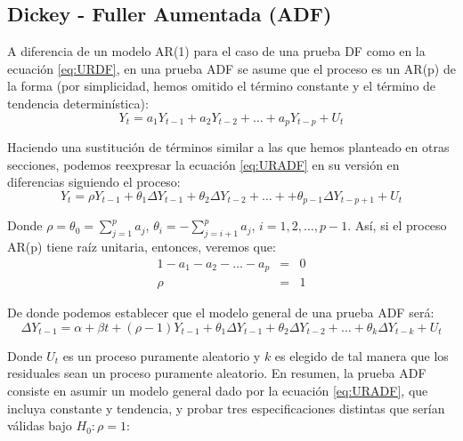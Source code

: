 \documentclass[
]{book}
\begin{document}
\hypertarget{dickey---fuller-aumentada-adf}{%
\subsection{Dickey - Fuller Aumentada (ADF)}\label{dickey---fuller-aumentada-adf}}

A diferencia de un modelo AR(1) para el caso de una prueba DF como en la ecuación \eqref{eq:URDF}, en una prueba ADF se asume que el proceso es un AR(p) de la forma (por simplicidad, hemos omitido el término constante y el término de tendencia determinística):
\begin{equation}
    Y_t = a_1 Y_{t-1} + a_2 Y_{t-2} + \ldots + a_p Y_{t-p} + U_t
    \label{eq:URADF}
\end{equation}

Haciendo una sustitución de términos similar a las que hemos planteado en otras secciones, podemos reexpresar la ecuación \eqref{eq:URADF} en su versión en diferencias siguiendo el proceso:
\begin{equation}
    Y_t = \rho Y_{t-1} + \theta_1 \Delta Y_{t-1} + \theta_2 \Delta Y_{t-2} + \ldots + + \theta_{p-1} \Delta Y_{t-p+1} + U_t 
\end{equation}

Donde \(\rho = \theta_0 = \sum_{j = 1}^p a_j\), \(\theta_i = - \sum_{j = i + 1}^p a_j\), \(i = 1, 2, \ldots, p-1\). Así, si el proceso AR(p) tiene raíz unitaria, entonces, veremos que:
\begin{eqnarray*}
    1 - a_1 - a_2 - \ldots - a_p & = & 0 \\
    \rho & = & 1
\end{eqnarray*}

De donde podemos establecer que el modelo general de una prueba ADF será:
\begin{equation}
    \Delta Y_{t-1} = \alpha + \beta t + (\rho - 1) Y_{t-1} + \theta_1 \Delta Y_{t-1} + \theta_2 \Delta Y_{t-2} + \ldots + \theta_k \Delta Y_{t-k} + U_t
\end{equation}

Donde \(U_t\) es un proceso puramente aleatorio y \(k\) es elegido de tal manera que los residuales sean un proceso puramente aleatorio. En resumen, la prueba ADF consiste en asumir un modelo general dado por la ecuación \eqref{eq:URADF}, que incluya constante y tendencia, y probar tres especificaciones distintas que serían válidas bajo \(H_0 : \rho = 1\):
\end{document}
